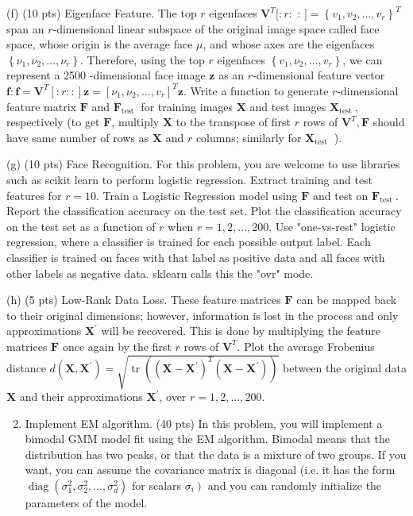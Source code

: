 \documentclass[10pt]{article}
\begin{document}
(f) (10 pts) Eigenface Feature. The top $r$ eigenfaces $\mathbf{V}^{T}[: r:$ : $]=\left\{v_{1}, v_{2}, \ldots, v_{r}\right\}^{T}$ span an $r$-dimensional linear subspace of the original image space called face space, whose origin is the average face $\mu$, and whose axes are the eigenfaces $\left\{\nu_{1}, \nu_{2}, \ldots, \nu_{r}\right\}$. Therefore, using the top $r$ eigenfaces $\left\{v_{1}, \nu_{2}, \ldots, v_{r}\right\}$, we can represent a 2500 -dimensional face image $\mathbf{z}$ as an $r$-dimensional feature vector $\mathbf{f}: \mathbf{f}=\mathbf{V}^{T}[: r::] \mathbf{z}=\left[\nu_{1}, \nu_{2}, \ldots, v_{r}\right]^{T} \mathbf{z}$. Write a function to generate $r$-dimensional feature matrix $\mathbf{F}$ and $\mathbf{F}_{\text {test }}$ for training images $\mathbf{X}$ and test images $\mathbf{X}_{\text {test }}$, respectively (to get $\mathbf{F}$, multiply $\mathbf{X}$ to the transpose of first $r$ rows of $\mathbf{V}^{T}, \mathbf{F}$ should have same number of rows as $\mathbf{X}$ and $r$ columns; similarly for $\mathbf{X}_{\text {test }}$ ).

(g) (10 pts) Face Recognition. For this problem, you are welcome to use libraries such as scikit learn to perform logistic regression. Extract training and test features for $r=10$. Train a Logistic Regression model using $\mathbf{F}$ and test on $\mathbf{F}_{\text {test }}$. Report the classification accuracy on the test set. Plot the classification accuracy on the test set as a function of $r$ when $r=1,2, \ldots, 200$. Use "one-vs-rest" logistic regression, where a classifier is trained for each possible output label. Each classifier is trained on faces with that label as positive data and all faces with other labels as negative data. sklearn calls this the "ovr" mode.

(h) (5 pts) Low-Rank Data Loss. These feature matrices $\mathbf{F}$ can be mapped back to their original dimensions; however, information is lost in the process and only approximations $\mathbf{X}^{\prime}$ will be recovered. This is done by multiplying the feature matrices $\mathbf{F}$ once again by the first $r$ rows of $\mathbf{V}^{T}$. Plot the average Frobenius distance $d\left(\mathbf{X}, \mathbf{X}^{\prime}\right)=\sqrt{\operatorname{tr}\left(\left(\mathbf{X}-\mathbf{X}^{\prime}\right)^{T}\left(\mathbf{X}-\mathbf{X}^{\prime}\right)\right)}$ between the original data $\mathbf{X}$ and their approximations $\mathbf{X}^{\prime}$, over $r=1,2, \ldots, 200$.

\begin{enumerate}
  \setcounter{enumi}{1}
  \item Implement EM algorithm. (40 pts) In this problem, you will implement a bimodal GMM model fit using the EM algorithm. Bimodal means that the distribution has two peaks, or that the data is a mixture of two groups. If you want, you can assume the covariance matrix is diagonal (i.e. it has the form $\operatorname{diag}\left(\sigma_{1}^{2}, \sigma_{2}^{2}, \ldots, \sigma_{d}^{2}\right)$ for scalars $\left.\sigma_{i}\right)$ and you can randomly initialize the parameters of the model.
\end{enumerate}
\end{document}
